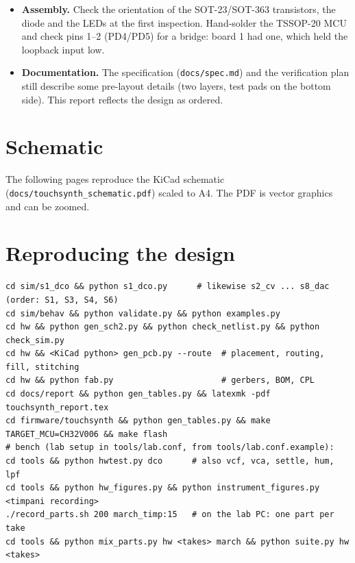 \documentclass[11pt,a4paper]{article}
\newcommand{\file}[1]{\texttt{#1}}
\begin{document}
\begin{itemize}
    TSSOP-20 pin numbers and the same \texttt{\_2} remap functions as the CH32V002. The reset pin is PD7; PA4 is
    bonded to PD7 inside the package and is never used. Board 1 carries a CH32V006.
  \item \textbf{Assembly.} Check the orientation of the SOT-23/SOT-363 transistors, the diode and the LEDs
    at the first inspection. Hand-solder the TSSOP-20 MCU and check pins 1--2 (PD4/PD5) for a bridge: board 1
    had one, which held the loopback input low.
  \item \textbf{Documentation.} The specification (\file{docs/spec.md}) and the verification plan still
    describe some pre-layout details (two layers, test pads on the bottom side). This report reflects the
    design as ordered.
\end{itemize}

\appendix
\section{Schematic}\label{app:sch}
The following pages reproduce the KiCad schematic (\file{docs/touchsynth\_schematic.pdf}) scaled to A4. The
PDF is vector graphics and can be zoomed.



\section{Reproducing the design}
\begin{footnotesize}
\begin{verbatim}
cd sim/s1_dco && python s1_dco.py      # likewise s2_cv ... s8_dac (order: S1, S3, S4, S6)
cd sim/behav && python validate.py && python examples.py
cd hw && python gen_sch2.py && python check_netlist.py && python check_sim.py
cd hw && <KiCad python> gen_pcb.py --route  # placement, routing, fill, stitching
cd hw && python fab.py                      # gerbers, BOM, CPL
cd docs/report && python gen_tables.py && latexmk -pdf touchsynth_report.tex
cd firmware/touchsynth && python gen_tables.py && make TARGET_MCU=CH32V006 && make flash
# bench (lab setup in tools/lab.conf, from tools/lab.conf.example):
cd tools && python hwtest.py dco      # also vcf, vca, settle, hum, lpf
cd tools && python hw_figures.py && python instrument_figures.py <timpani recording>
./record_parts.sh 200 march_timp:15   # on the lab PC: one part per take
cd tools && python mix_parts.py hw <takes> march && python suite.py hw <takes>
\end{verbatim}
\end{footnotesize}
\end{document}
